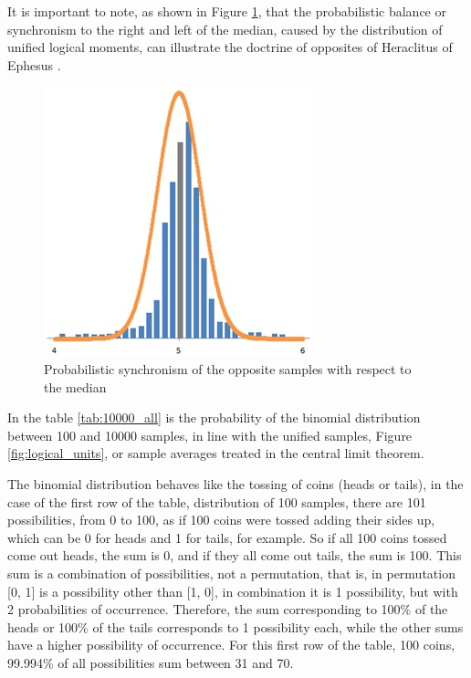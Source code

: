 It is important to note, as shown in Figure \ref{fig:trend_chart_of_normal_distribution}, that the probabilistic balance or synchronism to the right and left of the median, caused by the distribution of unified logical moments, can illustrate the doctrine of opposites of Heraclitus of Ephesus \cite{heraclitus}.
	\begin{figure}[H]
	\caption{Probabilistic synchronism of the opposite samples with respect to the median}
	\label{fig:trend_chart_of_normal_distribution}
	\centering
	\includegraphics[scale=1]{sections/images/trend_chart_of_normal_distribution.jpg}
	\end{figure}

In the table \ref{tab:10000_all} is the probability of the binomial distribution between 100 and 10000 samples, in line with the unified samples, Figure \ref{fig:logical_units}, or sample averages treated in the central limit theorem.

The binomial distribution behaves like the tossing of coins (heads or tails), in the case of the first row of the table, distribution of 100 samples, there are 101 possibilities, from 0 to 100, as if 100 coins were tossed adding their sides up, which can be 0 for heads and 1 for tails, for example. So if all 100 coins tossed come out heads, the sum is 0, and if they all come out tails, the sum is 100. This sum is a combination of possibilities, not a permutation, that is, in permutation [0, 1] is a possibility other than [1, 0], in combination it is 1 possibility, but with 2 probabilities of occurrence. Therefore, the sum corresponding to 100\% of the heads or 100\% of the tails corresponds to 1 possibility each, while the other sums have a higher possibility of occurrence. For this first row of the table, 100 coins, 99.994\% of all possibilities sum between 31 and 70. 

